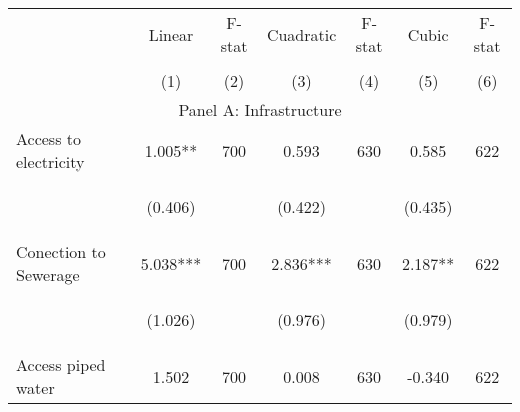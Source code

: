 \begin{tabular}{lcccccc}


\toprule


\multicolumn{1}{l}{} & \multicolumn{1}{c}{Linear} & \multicolumn{1}{c}{F-stat} & \multicolumn{1}{c}{Cuadratic} & \multicolumn{1}{c}{F-stat} & \multicolumn{1}{c}{Cubic} & \multicolumn{1}{c}{F-stat}  \\

\cmidrule(l{1mm}r{1mm}){2-3} \cmidrule(l{1mm}r{1mm}){4-5} \cmidrule(l{1mm}r{1mm}){6-7}   \\

 & (1) & (2) & (3) & (4) & (5) & (6)  \\ 
 

\hline

\multicolumn{7}{c}{Panel A: Infrastructure}   \\                                                          

Access to electricity   &  1.005**   &  700  &   0.593  &  630 &  0.585  &  622 \\

\vspace{4pt} &  \begin{footnotesize}(0.406)\end{footnotesize}   & &
			    \begin{footnotesize}(0.422)\end{footnotesize}   & &
			    \begin{footnotesize}(0.435)\end{footnotesize}   & 
			     \\          


Conection to Sewerage   &  5.038***   &  700  &   2.836***  &  630 &  2.187**  &  622   \\

\vspace{4pt} &  \begin{footnotesize}(1.026)\end{footnotesize}   & &
			    \begin{footnotesize}(0.976)\end{footnotesize}   & &
			    \begin{footnotesize}(0.979)\end{footnotesize}   &
			     \\          


Access piped water   &  1.502   &  700  &   0.008  &  630 &  -0.340  &  622   \\



\end{tabular}
